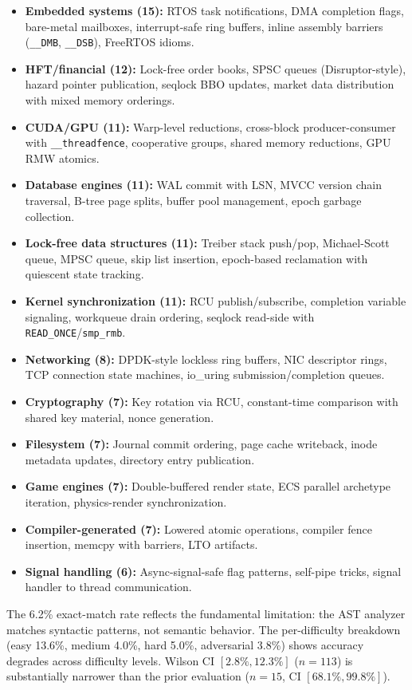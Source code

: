 \documentclass[11pt]{article}
\begin{document}
\begin{itemize}[nosep]
\item \textbf{Embedded systems (15):} RTOS task notifications, DMA
  completion flags, bare-metal mailboxes, interrupt-safe ring buffers,
  inline assembly barriers (\texttt{\_\_DMB}, \texttt{\_\_DSB}), FreeRTOS idioms.
\item \textbf{HFT/financial (12):} Lock-free order books, SPSC queues
  (Disruptor-style), hazard pointer publication, seqlock BBO updates,
  market data distribution with mixed memory orderings.
\item \textbf{CUDA/GPU (11):} Warp-level reductions, cross-block
  producer-consumer with \texttt{\_\_threadfence}, cooperative groups,
  shared memory reductions, GPU RMW atomics.
\item \textbf{Database engines (11):} WAL commit with LSN, MVCC version
  chain traversal, B-tree page splits, buffer pool management, epoch
  garbage collection.
\item \textbf{Lock-free data structures (11):} Treiber stack push/pop,
  Michael-Scott queue, MPSC queue, skip list insertion, epoch-based
  reclamation with quiescent state tracking.
\item \textbf{Kernel synchronization (11):} RCU publish/subscribe,
  completion variable signaling, workqueue drain ordering, seqlock
  read-side with \texttt{READ\_ONCE}/\texttt{smp\_rmb}.
\item \textbf{Networking (8):} DPDK-style lockless ring buffers,
  NIC descriptor rings, TCP connection state machines, io\_uring
  submission/completion queues.
\item \textbf{Cryptography (7):} Key rotation via RCU, constant-time
  comparison with shared key material, nonce generation.
\item \textbf{Filesystem (7):} Journal commit ordering, page cache
  writeback, inode metadata updates, directory entry publication.
\item \textbf{Game engines (7):} Double-buffered render state, ECS
  parallel archetype iteration, physics-render synchronization.
\item \textbf{Compiler-generated (7):} Lowered atomic operations,
  compiler fence insertion, memcpy with barriers, LTO artifacts.
\item \textbf{Signal handling (6):} Async-signal-safe flag patterns,
  self-pipe tricks, signal handler to thread communication.
\end{itemize}

The 6.2\% exact-match rate reflects the fundamental limitation:
the AST analyzer matches syntactic patterns, not semantic behavior.
The per-difficulty breakdown (easy 13.6\%, medium 4.0\%, hard 5.0\%,
adversarial 3.8\%) shows accuracy degrades across difficulty levels.
Wilson CI $[2.8\%, 12.3\%]$ ($n=113$) is substantially narrower than
the prior evaluation ($n=15$, CI $[68.1\%, 99.8\%]$).
\end{document}
